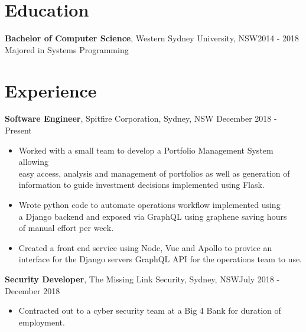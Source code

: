 \documentclass[margin]{res}
\begin{document}

\address{{\bf Present Address} \\ 26/23-25 John Street\\ Lidcombe, NSW 2141}
\address{{\bf Contact Details} \\ ben.hili1994@gmail.com \\ +61414329597}


\begin{resume}

\section{Education}
	{\bf Bachelor of Computer Science}, Western Sydney University, NSW\hfill 2014 - 2018\\ 
	Majored in Systems Programming

\section{Experience}
{\bf Software Engineer}, 
	Spitfire Corporation, Sydney, NSW \hfill December 2018 - Present
\begin{itemize} \itemsep 2pt  %

\item Worked with a small team to develop a Portfolio Management System allowing \\
	easy access, analysis and management of portfolios as well as generation of \\
		information to guide investment decisions implemented using Flask.  

\item Wrote python code to automate operations workflow implemented using \\
	a Django backend and exposed via GraphQL using graphene saving hours \\
		of manual effort per week.

\item Created a front end service using Node, Vue and Apollo to provice an \\
	interface for the Django servers GraphQL API for the operations team to use. 
	
\end{itemize}

{\bf Security Developer}, 
	The Missing Link Security, Sydney, NSW\hfill July 2018 - December 2018
\begin{itemize} \itemsep 2pt  %
\item Contracted out to a cyber security team at a Big 4 Bank for duration of \\
	employment.


\end{itemize}
\end{resume}
\end{document}
